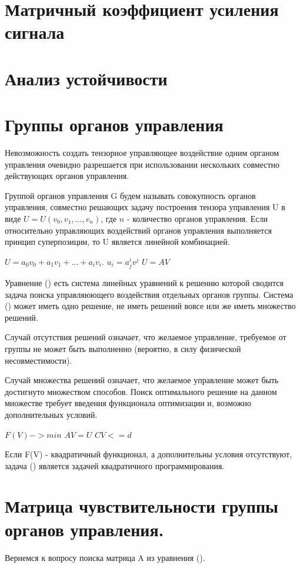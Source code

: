 \documentclass[a4paper]{article}
\begin{document}
\section{Матричный коэффициент усиления сигнала}

\section{Анализ устойчивости}

\section{Группы органов управления}
Невозможность создать тензорное управляющее воздействие одним органом управления очевидно разрешается при использовании нескольких совместно действующих органов управления.

Группой органов управления G будем называть совокупность органов управления, совместно решающих задачу построения тензора управления U в виде $U = U(v_0, v_1, ..., v_n)$, где $n$ - количество органов управления. Если относительно управляющих воздействий органов управления выполняется принцип суперпозиции, то U является линейной комбинацией. 

$U = a_0v_0 + a_1v_1 + ... + a_iv_i.$
$u_i=a^i_jv^j$
$U = AV$

Уравнение () есть система линейных уравнений к решению которой сводится задача поиска управляюющего воздействия отдельных органов группы. Система () может иметь одно решение, не иметь решений вовсе или же иметь множество решений.

Случай отсутствия решений означает, что желаемое управление, требуемое от группы не может быть выполненно (вероятно, в силу физической несовместимости). 

Случай множества решений означает, что желаемое управление может быть достигнуто множеством способов. Поиск оптимального решение на данном множестве требует введения функционала оптимизации и, возможно дополнительных условий.

$F(V) -> min$
$AV = U$
$CV <= d$

Если F(V) - квадратичный функционал, а дополнительны условия отсутствуют, задача () является задачей квадратичного программирования.  

\section{Матрица чувствительности группы органов управления.}
Вернемся к вопросу поиска матрица A из уравнения ().
\end{document}
